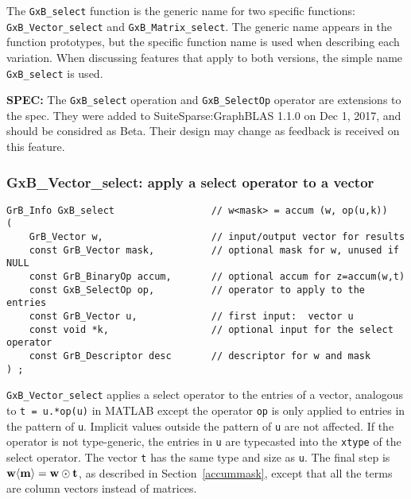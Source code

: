 \documentclass[12pt]{article}
\begin{document}
The \verb'GxB_select' function is the generic name for two specific functions:
\\ \verb'GxB_Vector_select' and  \verb'GxB_Matrix_select'.  The generic name
appears in the function prototypes, but the specific function name is used when
describing each variation.  When discussing features that apply to both
versions, the simple name \verb'GxB_select' is used.

\begin{specbeta}
{\bf SPEC:} The \verb'GxB_select' operation and \verb'GxB_SelectOp' operator
are extensions to the spec.  They were added to SuiteSparse:GraphBLAS 1.1.0
on Dec 1, 2017, and should be considred as Beta.  Their design may change as
feedback is received on this feature.
\end{specbeta}

\subsubsection{{\sf GxB\_Vector\_select:} apply a select operator to a vector}
\label{select_vector}

\begin{mdframed}[userdefinedwidth=6in]
{\footnotesize
\begin{verbatim}
GrB_Info GxB_select                 // w<mask> = accum (w, op(u,k))
(
    GrB_Vector w,                   // input/output vector for results
    const GrB_Vector mask,          // optional mask for w, unused if NULL
    const GrB_BinaryOp accum,       // optional accum for z=accum(w,t)
    const GxB_SelectOp op,          // operator to apply to the entries
    const GrB_Vector u,             // first input:  vector u
    const void *k,                  // optional input for the select operator
    const GrB_Descriptor desc       // descriptor for w and mask
) ;
\end{verbatim} } \end{mdframed}

\verb'GxB_Vector_select' applies a select operator to the entries of a vector,
analogous to \verb't = u.*op(u)'  in MATLAB except the operator \verb'op' is
only applied to entries in the pattern of \verb'u'.  Implicit values outside
the pattern of \verb'u' are not affected.  If the operator is not type-generic,
the entries in \verb'u' are typecasted into the \verb'xtype' of the select
operator.  The vector \verb't' has the same type and size as \verb'u'.  The
final step is ${\bf w \langle m \rangle  = w \odot t}$, as described in
Section~\ref{accummask}, except that all the terms are column vectors instead
of matrices.
\end{document}
